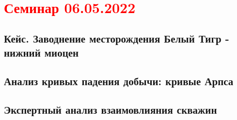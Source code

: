 \documentclass[main.tex]{subfiles}
\begin{document}
\section{\textcolor{red}{Семинар 06.05.2022}}

\subsection{Кейс. Заводнение месторождения Белый Тигр - нижний миоцен}

\subsection{Анализ кривых падения добычи: кривые Арпса}

\subsection{Экспертный анализ взаимовлияния скважин}
\end{document}
